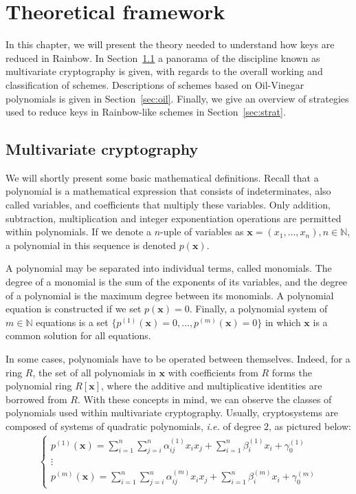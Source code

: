 \documentclass[openright]{report}
\begin{document}
\chapter{Theoretical framework}

In this chapter, we will present the theory needed to understand how keys are reduced in Rainbow. In Section~\ref{sec:mult} a panorama of the discipline known as multivariate cryptography is given, with regards to the overall working and classification of schemes. Descriptions of schemes based on Oil-Vinegar polynomials is given in Section~\ref{sec:oil}. Finally, we give an overview of strategies used to reduce keys in Rainbow-like schemes in Section~\ref{sec:strat}.

\section{Multivariate cryptography}\label{sec:mult}

We will shortly present some basic mathematical definitions. Recall that a polynomial is a mathematical expression that consists of indeterminates, also called variables, and coefficients that multiply these variables. Only addition, subtraction, multiplication and integer exponentiation operations are permitted within polynomials. If we denote a $n$-uple of variables as $\mathbf{x} = (x_{1}, \dots, x_{n}), n \in \mathbb{N}$, a polynomial in this sequence is denoted $p(\mathbf{x})$. 

A polynomial may be separated into individual terms, called monomials. The degree of a monomial is the sum of the exponents of its variables, and the degree of a polynomial is the maximum degree between its monomials. A polynomial equation is constructed if we set $p(\mathbf{x}) = 0$. Finally, a polynomial system of $m \in \mathbb{N}$ equations is a set $\{p^{(1)}(\mathbf{x}) = 0, \dots, p^{(m)}(\mathbf{x}) = 0\}$ in which $\mathbf{x}$ is a common solution for all equations.

In some cases, polynomials have to be operated between themselves. Indeed, for a ring $R$, the set of all polynomials in $\mathbf{x}$ with coefficients from $R$ forms the polynomial ring $R[\mathbf{x}]$, where the additive and multiplicative identities are borrowed from $R$. With these concepts in mind, we can observe the classes of polynomials used within multivariate cryptography. Usually, cryptosystems are composed of systems of quadratic polynomials, \emph{i.e.} of degree $2$, as pictured below:
\begin{align}
    \begin{cases}
        p^{(1)}(\mathbf{x}) = \sum_{i = 1}^{n} \sum_{j = i}^{n} \alpha_{ij}^{(1)} x_{i} x_{j} + \sum_{i = 1}^{n} \beta_{i}^{(1)} x_{i} + \gamma_{0}^{(1)} \\
        \vdots \\
        p^{(m)}(\mathbf{x}) = \sum_{i = 1}^{n} \sum_{j = i}^{n} \alpha_{ij}^{(m)} x_{i} x_{j} + \sum_{i = 1}^{n} \beta_{i}^{(m)} x_{i} + \gamma_{0}^{(m)}
    \end{cases}
\end{align}
\end{document}
